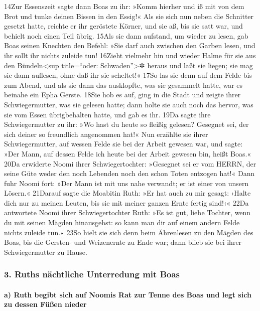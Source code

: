 14Zur Essenszeit sagte dann Boas zu ihr: »Komm hierher und iß mit von
dem Brot und tunke deinen Bissen in den Essig!« Als sie sich nun neben
die Schnitter gesetzt hatte, reichte er ihr geröstete Körner, und sie
aß, bis sie satt war, und behielt noch einen Teil übrig. 15Als sie dann
aufstand, um wieder zu lesen, gab Boas seinen Knechten den Befehl: »Sie
darf auch zwischen den Garben lesen, und ihr sollt ihr nichts zuleide
tun! 16Zieht vielmehr hin und wieder Halme für sie aus den
Bündeln\textless sup title=``oder: Schwaden''\textgreater✲ heraus und
laßt sie liegen; sie mag sie dann auflesen, ohne daß ihr sie scheltet!«
17So las sie denn auf dem Felde bis zum Abend, und als sie dann das
ausklopfte, was sie gesammelt hatte, war es beinahe ein Epha Gerste.
18Sie hob es auf, ging in die Stadt und zeigte ihrer Schwiegermutter,
was sie gelesen hatte; dann holte sie auch noch das hervor, was sie vom
Essen übrigbehalten hatte, und gab es ihr. 19Da sagte ihre
Schwiegermutter zu ihr: »Wo hast du heute so fleißig gelesen? Gesegnet
sei, der sich deiner so freundlich angenommen hat!« Nun erzählte sie
ihrer Schwiegermutter, auf wessen Felde sie bei der Arbeit gewesen war,
und sagte: »Der Mann, auf dessen Felde ich heute bei der Arbeit gewesen
bin, heißt Boas.« 20Da erwiderte Noomi ihrer Schwiegertochter: »Gesegnet
sei er vom HERRN, der seine Güte weder den noch Lebenden noch den schon
Toten entzogen hat!« Dann fuhr Noomi fort: »Der Mann ist mit uns nahe
verwandt; er ist einer von unsern Lösern.« 21Darauf sagte die Moabitin
Ruth: »Er hat auch zu mir gesagt: ›Halte dich nur zu meinen Leuten, bis
sie mit meiner ganzen Ernte fertig sind!‹« 22Da antwortete Noomi ihrer
Schwiegertochter Ruth: »Es ist gut, liebe Tochter, wenn du mit seinen
Mägden hinausgehst: so kann man dir auf einem andern Felde nichts
zuleide tun.« 23So hielt sie sich denn beim Ährenlesen zu den Mägden des
Boas, bis die Gersten- und Weizenernte zu Ende war; dann blieb sie bei
ihrer Schwiegermutter zu Hause.

\hypertarget{ruths-nuxe4chtliche-unterredung-mit-boas}{%
\subsubsection{3. Ruths nächtliche Unterredung mit
Boas}\label{ruths-nuxe4chtliche-unterredung-mit-boas}}

\hypertarget{a-ruth-begibt-sich-auf-noomis-rat-zur-tenne-des-boas-und-legt-sich-zu-dessen-fuxfcuxdfen-nieder}{%
\paragraph{a) Ruth begibt sich auf Noomis Rat zur Tenne des Boas und
legt sich zu dessen Füßen
nieder}\label{a-ruth-begibt-sich-auf-noomis-rat-zur-tenne-des-boas-und-legt-sich-zu-dessen-fuxfcuxdfen-nieder}}


